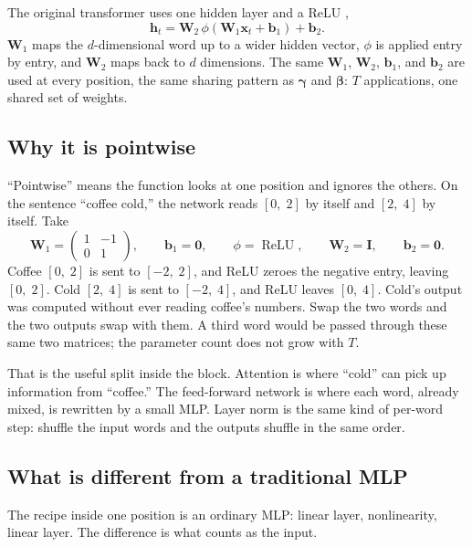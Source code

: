 \documentclass[11pt]{article}
\begin{document}
The original transformer uses one hidden layer and a ReLU
\cite{vaswani2017attention},
\[
  \mathbf{h}_t
  =
  \mathbf{W}_2\,
  \phi(\mathbf{W}_1 \mathbf{x}_t + \mathbf{b}_1)
  +
  \mathbf{b}_2.
\]
\(\mathbf{W}_1\) maps the \(d\)-dimensional word up to a wider hidden
vector, \(\phi\) is applied entry by entry, and \(\mathbf{W}_2\) maps back
to \(d\) dimensions. The same \(\mathbf{W}_1\), \(\mathbf{W}_2\),
\(\mathbf{b}_1\), and \(\mathbf{b}_2\) are used at every position, the same
sharing pattern as \(\boldsymbol{\gamma}\) and \(\boldsymbol{\beta}\): \(T\)
applications, one shared set of weights.

\subsection{Why it is pointwise}

``Pointwise'' means the function looks at one position and ignores the
others. On the sentence ``coffee cold,'' the network reads
\([0,\; 2]\) by itself and \([2,\; 4]\) by itself. Take
\[
  \mathbf{W}_1
  =
  \begin{pmatrix} 1 & -1 \\ 0 & 1 \end{pmatrix},
  \qquad
  \mathbf{b}_1=\mathbf{0},
  \qquad
  \phi=\operatorname{ReLU},
  \qquad
  \mathbf{W}_2=\mathbf{I},
  \qquad
  \mathbf{b}_2=\mathbf{0}.
\]
Coffee \([0,\; 2]\) is sent to \([-2,\; 2]\), and ReLU zeroes the negative
entry, leaving \([0,\; 2]\). Cold \([2,\; 4]\) is sent to \([-2,\; 4]\),
and ReLU leaves \([0,\; 4]\). Cold's output was computed without ever
reading coffee's numbers. Swap the two words and the two outputs swap with
them. A third word would be passed through these same two matrices; the
parameter count does not grow with \(T\).

That is the useful split inside the block. Attention is where ``cold'' can
pick up information from ``coffee.'' The feed-forward network is where each
word, already mixed, is rewritten by a small MLP. Layer norm is the same
kind of per-word step: shuffle the input words and the outputs shuffle in
the same order.

\subsection{What is different from a traditional MLP}

The recipe inside one position is an ordinary MLP: linear layer,
nonlinearity, linear layer. The difference is what counts as the input.
\end{document}
